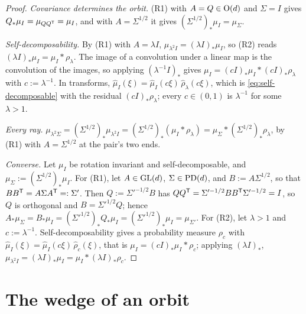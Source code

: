 \begin{proof}
\leanok
\emph{Covariance determines the orbit.} (R1) with $A = Q \in \mathrm{O}(d)$ and $\Sigma = I$ gives
$Q_*\mu_I = \mu_{QQ^{\mathsf{T}}} = \mu_I$, and with $A = \Sigma^{1/2}$ it gives
$(\Sigma^{1/2})_*\mu_I = \mu_\Sigma$.

\emph{Self-decomposability.} By (R1) with $A = \lambda I$, $\mu_{\lambda^2I} = (\lambda I)_*\mu_I$,
so (R2) reads $(\lambda I)_*\mu_I = \mu_I * \rho_\lambda$. The image of a convolution under a
linear map is the convolution of the images, so applying $(\lambda^{-1}I)_*$ gives
$\mu_I = (cI)_*\mu_I * (cI)_*\rho_\lambda$ with $c := \lambda^{-1}$. In transforms,
$\widehat\mu_I(\xi) = \widehat\mu_I(c\xi)\,\widehat\rho_\lambda(c\xi)$, which is
\ref{eq:self-decomposable} with the residual $(cI)_*\rho_\lambda$; every $c \in (0,1)$ is
$\lambda^{-1}$ for some $\lambda > 1$.

\emph{Every ray.} $\mu_{\lambda^2\Sigma} = (\Sigma^{1/2})_*\mu_{\lambda^2I}
= (\Sigma^{1/2})_*(\mu_I * \rho_\lambda) = \mu_\Sigma * (\Sigma^{1/2})_*\rho_\lambda$, by (R1) with
$A = \Sigma^{1/2}$ at the pair's two ends.

\emph{Converse.} Let $\mu_I$ be rotation invariant and self-decomposable, and
$\mu_\Sigma := (\Sigma^{1/2})_*\mu_I$. For (R1), let $A \in \mathrm{GL}(d)$, $\Sigma \in \mathrm{PD}(d)$, and
$B := A\Sigma^{1/2}$, so that $BB^{\mathsf{T}} = A\Sigma A^{\mathsf{T}} =: \Sigma'$. Then
$Q := \Sigma'^{-1/2}B$ has $QQ^{\mathsf{T}} = \Sigma'^{-1/2}BB^{\mathsf{T}}\Sigma'^{-1/2} = I$, so $Q$ is
orthogonal and $B = \Sigma'^{1/2}Q$; hence
$A_*\mu_\Sigma = B_*\mu_I = (\Sigma'^{1/2})_*Q_*\mu_I = (\Sigma'^{1/2})_*\mu_I = \mu_{\Sigma'}$.
For (R2), let $\lambda > 1$ and $c := \lambda^{-1}$. Self-decomposability gives a probability
measure $\rho_c$ with $\widehat\mu_I(\xi) = \widehat\mu_I(c\xi)\,\widehat\rho_c(\xi)$, that is
$\mu_I = (cI)_*\mu_I * \rho_c$; applying $(\lambda I)_*$,
$\mu_{\lambda^2I} = (\lambda I)_*\mu_I = \mu_I * (\lambda I)_*\rho_c$.
\end{proof}

\section{The wedge of an orbit}
\label{sec:affine-stable-cone}

